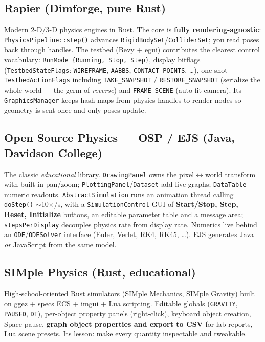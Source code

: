 \documentclass[11pt]{article}
\newcommand{\code}[1]{\texttt{#1}}
\begin{document}
\subsection{Rapier (Dimforge, pure Rust)}

Modern 2-D/3-D physics engines in Rust. The core is \textbf{fully
rendering-agnostic}: \code{PhysicsPipeline::step()} advances
\code{RigidBodySet}/\code{ColliderSet}; you read poses back through
handles. The testbed (Bevy + egui) contributes the clearest control
vocabulary: \code{RunMode \{Running, Stop, Step\}}, display bitflags
(\code{TestbedStateFlags}: \code{WIREFRAME}, \code{AABBS},
\code{CONTACT\_POINTS}, \ldots), one-shot \code{TestbedActionFlags}
including \code{TAKE\_SNAPSHOT} / \code{RESTORE\_SNAPSHOT} (serialize
the whole world --- the germ of \emph{reverse}) and
\code{FRAME\_SCENE} (auto-fit camera). Its \code{GraphicsManager}
keeps hash maps from physics handles to render nodes so geometry is
sent once and only poses update.

\subsection{Open Source Physics --- OSP / EJS (Java, Davidson College)}

The classic \emph{educational} library. \code{DrawingPanel} owns the
pixel$\leftrightarrow$world transform with built-in pan/zoom;
\code{PlottingPanel}/\code{Dataset} add live graphs; \code{DataTable}
numeric readouts. \code{AbstractSimulation} runs an animation thread
calling \code{doStep()} $\sim$10$\times$/s, with a
\code{SimulationControl} GUI of \textbf{Start/Stop, Step, Reset,
Initialize} buttons, an editable parameter table and a message area;
\code{stepsPerDisplay} decouples physics rate from display rate.
Numerics live behind an \code{ODE}/\code{ODESolver} interface (Euler,
Verlet, RK4, RK45, \ldots). EJS generates Java \emph{or} JavaScript
from the same model.

\subsection{SIMple Physics (Rust, educational)}

High-school-oriented Rust simulators (SIMple Mechanics, SIMple
Gravity) built on ggez + specs ECS + imgui + Lua scripting. Editable
globals (\code{GRAVITY}, \code{PAUSED}, \code{DT}), per-object
property panels (right-click), keyboard object creation, Space pause,
\textbf{graph object properties and export to CSV} for lab reports,
Lua scene presets. Its lesson: make every quantity inspectable and
tweakable.
\end{document}
